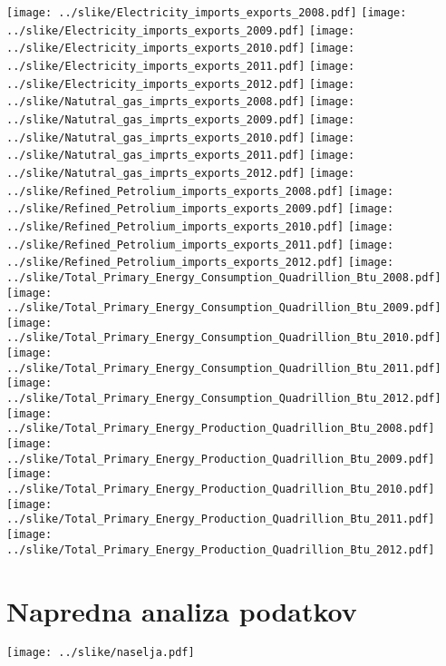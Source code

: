 \documentclass[11pt,a4paper]{article}
\begin{document}
\texttt{[image: ../slike/Electricity\_imports\_exports\_2008.pdf]}
\texttt{[image: ../slike/Electricity\_imports\_exports\_2009.pdf]}
\texttt{[image: ../slike/Electricity\_imports\_exports\_2010.pdf]}
\texttt{[image: ../slike/Electricity\_imports\_exports\_2011.pdf]}
\texttt{[image: ../slike/Electricity\_imports\_exports\_2012.pdf]}
\texttt{[image: ../slike/Natutral\_gas\_imprts\_exports\_2008.pdf]}
\texttt{[image: ../slike/Natutral\_gas\_imprts\_exports\_2009.pdf]}
\texttt{[image: ../slike/Natutral\_gas\_imprts\_exports\_2010.pdf]}
\texttt{[image: ../slike/Natutral\_gas\_imprts\_exports\_2011.pdf]}
\texttt{[image: ../slike/Natutral\_gas\_imprts\_exports\_2012.pdf]}
\texttt{[image: ../slike/Refined\_Petrolium\_imports\_exports\_2008.pdf]}
\texttt{[image: ../slike/Refined\_Petrolium\_imports\_exports\_2009.pdf]}
\texttt{[image: ../slike/Refined\_Petrolium\_imports\_exports\_2010.pdf]}
\texttt{[image: ../slike/Refined\_Petrolium\_imports\_exports\_2011.pdf]}
\texttt{[image: ../slike/Refined\_Petrolium\_imports\_exports\_2012.pdf]}
\texttt{[image: ../slike/Total\_Primary\_Energy\_Consumption\_Quadrillion\_Btu\_2008.pdf]}
\texttt{[image: ../slike/Total\_Primary\_Energy\_Consumption\_Quadrillion\_Btu\_2009.pdf]}
\texttt{[image: ../slike/Total\_Primary\_Energy\_Consumption\_Quadrillion\_Btu\_2010.pdf]}
\texttt{[image: ../slike/Total\_Primary\_Energy\_Consumption\_Quadrillion\_Btu\_2011.pdf]}
\texttt{[image: ../slike/Total\_Primary\_Energy\_Consumption\_Quadrillion\_Btu\_2012.pdf]}
\texttt{[image: ../slike/Total\_Primary\_Energy\_Production\_Quadrillion\_Btu\_2008.pdf]}
\texttt{[image: ../slike/Total\_Primary\_Energy\_Production\_Quadrillion\_Btu\_2009.pdf]}
\texttt{[image: ../slike/Total\_Primary\_Energy\_Production\_Quadrillion\_Btu\_2010.pdf]}
\texttt{[image: ../slike/Total\_Primary\_Energy\_Production\_Quadrillion\_Btu\_2011.pdf]}
\texttt{[image: ../slike/Total\_Primary\_Energy\_Production\_Quadrillion\_Btu\_2012.pdf]}

\section{Napredna analiza podatkov}

\texttt{[image: ../slike/naselja.pdf]}
\end{document}

